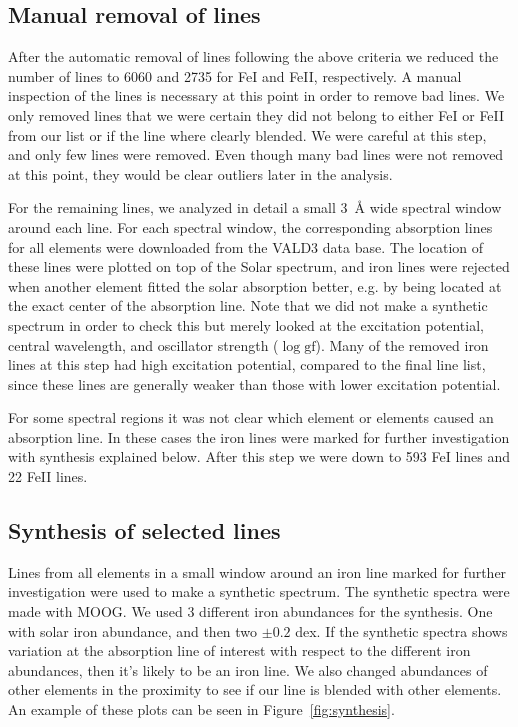\documentclass{aa}
\begin{document}
\subsection{Manual removal of lines}
\label{sub:manual_removal_of_lines}
After the automatic removal of lines following the above criteria
we reduced the number of lines to 6060 and 2735 for FeI and FeII,
respectively. A manual inspection of the lines is necessary at this
point in order to remove bad lines. We only removed lines that we were
certain they did not belong to either FeI or FeII from our list or if
the line where clearly blended. We were careful at this step, and only
few lines were removed. Even though many bad lines were not removed at
this point, they would be clear outliers later in the analysis.

For the remaining lines, we analyzed in detail a small \SI{3}{\angstrom}
wide spectral window around each line. For each spectral window, the
corresponding absorption lines for all elements were downloaded from the
VALD3 data base. The location of these lines were plotted on top of the
Solar spectrum, and iron lines were rejected when another element fitted
the solar absorption better, e.g. by being located at the exact center
of the absorption line. Note that we did not make a synthetic spectrum
in order to check this but merely looked at the excitation potential,
central wavelength, and oscillator strength ($\log \mathrm{gf}$). Many
of the removed iron lines at this step had high excitation potential,
compared to the final line list, since these lines are generally weaker
than those with lower excitation potential.

For some spectral regions it was not clear which element or elements
caused an absorption line. In these cases the iron lines were marked for
further investigation with synthesis explained below. After this step
we were down to 593 FeI lines and 22 FeII lines.



\subsection{Synthesis of selected lines}
\label{sub:synthesis_of_selected_lines}
Lines from all elements in a small window around an iron line marked
for further investigation were used to make a synthetic spectrum.
The synthetic spectra were made with MOOG. We used 3 different iron
abundances for the synthesis. One with solar iron abundance, and
then two $\pm0.2$ dex. If the synthetic spectra shows variation at
the absorption line of interest with respect to the different iron
abundances, then it's likely to be an iron line. We also changed
abundances of other elements in the proximity to see if our line is
blended with other elements. An example of these plots can be seen
in Figure~\ref{fig:synthesis}.
\end{document}
